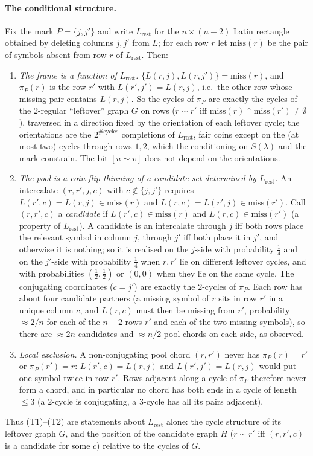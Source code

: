 \paragraph{The conditional structure.}  Fix the mark $P=\{j,j'\}$
and write $L_{\mathrm{rest}}$ for the $n\times(n-2)$ Latin rectangle
obtained by deleting columns $j,j'$ from $L$; for each row $r$ let
$\mathrm{miss}(r)$ be the pair of symbols absent from row $r$ of
$L_{\mathrm{rest}}$.  Then:
\begin{enumerate}[leftmargin=2.2em]
\item[(i)] \emph{The frame is a function of $L_{\mathrm{rest}}$.}
$\{L(r,j),L(r,j')\}=\mathrm{miss}(r)$, and $\pi_P(r)$ is the row $r'$
with $L(r',j')=L(r,j)$, i.e.\ the other row whose missing pair contains
$L(r,j)$.  So the cycles of $\pi_P$ are exactly the cycles of the
$2$-regular ``leftover'' graph $G$ on rows ($r\sim r'$ iff
$\mathrm{miss}(r)\cap\mathrm{miss}(r')\ne\emptyset$), traversed in a
direction fixed by the orientation of each leftover cycle; the
orientations are the $2^{\#\mathrm{cycles}}$ completions of
$L_{\mathrm{rest}}$, fair coins except on the (at most two) cycles
through rows $1,2$, which the conditioning on $S(\lambda)$ and the mark
constrain.  The bit $[u\sim v]$ does not depend on the orientations.
\item[(ii)] \emph{The pool is a coin-flip thinning of a candidate set
determined by $L_{\mathrm{rest}}$.}  An intercalate $(r,r',j,c)$ with
$c\notin\{j,j'\}$ requires $L(r',c)=L(r,j)\in\mathrm{miss}(r)$ and
$L(r,c)=L(r',j)\in\mathrm{miss}(r')$.  Call $(r,r',c)$ a
\emph{candidate} if $L(r',c)\in\mathrm{miss}(r)$ and
$L(r,c)\in\mathrm{miss}(r')$ (a property of $L_{\mathrm{rest}}$).  A
candidate is an intercalate through $j$ iff both rows place the
relevant symbol in column $j$, through $j'$ iff both place it in $j'$,
and otherwise it is nothing; so it is realised on the $j$-side with
probability $\tfrac14$ and on the $j'$-side with probability $\tfrac14$
when $r,r'$ lie on different leftover cycles, and with probabilities
$(\tfrac12,\tfrac12)$ or $(0,0)$ when they lie on the same cycle.  The
conjugating coordinates ($c=j'$) are exactly the $2$-cycles of $\pi_P$.
Each row has about four candidate partners (a missing symbol of $r$
sits in row $r'$ in a unique column $c$, and $L(r,c)$ must then be
missing from $r'$, probability $\approx2/n$ for each of the $n-2$ rows
$r'$ and each of the two missing symbols), so there are $\approx2n$
candidates and $\approx n/2$ pool chords on each side, as observed.
\item[(iii)] \emph{Local exclusion.}  A non-conjugating pool chord
$(r,r')$ never has $\pi_P(r)=r'$ or $\pi_P(r')=r$: $L(r',c)=L(r,j)$ and
$L(r',j')=L(r,j)$ would put one symbol twice in row $r'$.  Rows
adjacent along a cycle of $\pi_P$ therefore never form a chord, and in
particular no chord has both ends in a cycle of length $\le3$ (a
$2$-cycle is conjugating, a $3$-cycle has all its pairs adjacent).
\end{enumerate}
Thus (T1)--(T2) are statements about $L_{\mathrm{rest}}$ alone: the
cycle structure of its leftover graph $G$, and the position of the
candidate graph $H$ ($r\sim r'$ iff $(r,r',c)$ is a candidate for some
$c$) relative to the cycles of $G$.

